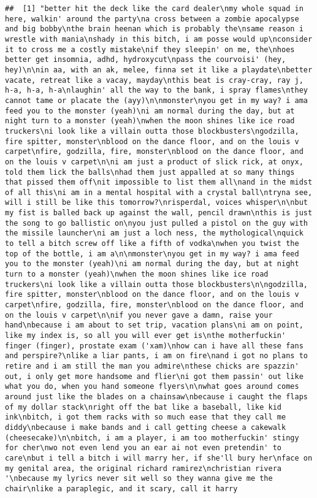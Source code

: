 \documentclass[]{article}
\begin{document}
\begin{verbatim}
##  [1] "better hit the deck like the card dealer\nmy whole squad in here, walkin' around the party\na cross between a zombie apocalypse and big bobby\nthe brain heenan which is probably the\nsame reason i wrestle with mania\nshady in this bitch, i am posse would up\nconsider it to cross me a costly mistake\nif they sleepin' on me, the\nhoes better get insomnia, adhd, hydroxycut\npass the courvoisi' (hey, hey)\n\nin aa, with an ak, melee, finna set it like a playdate\nbetter vacate, retreat like a vacay, mayday\nthis beat is cray-cray, ray j, h-a, h-a, h-a\nlaughin' all the way to the bank, i spray flames\nthey cannot tame or placate the (ayy)\n\nmonster\nyou get in my way? i ama feed you to the monster (yeah)\ni am normal during the day, but at night turn to a monster (yeah)\nwhen the moon shines like ice road truckers\ni look like a villain outta those blockbusters\ngodzilla, fire spitter, monster\nblood on the dance floor, and on the louis v carpet\nfire, godzilla, fire, monster\nblood on the dance floor, and on the louis v carpet\n\ni am just a product of slick rick, at onyx, told them lick the balls\nhad them just appalled at so many things that pissed them off\nit impossible to list them all\nand in the midst of all this\ni am in a mental hospital with a crystal ball\ntryna see, will i still be like this tomorrow?\nrisperdal, voices whisper\n\nbut my fist is balled back up against the wall, pencil drawn\nthis is just the song to go ballistic on\nyou just pulled a pistol on the guy with the missile launcher\ni am just a loch ness, the mythological\nquick to tell a bitch screw off like a fifth of vodka\nwhen you twist the top of the bottle, i am a\n\nmonster\nyou get in my way? i ama feed you to the monster (yeah)\ni am normal during the day, but at night turn to a monster (yeah)\nwhen the moon shines like ice road truckers\ni look like a villain outta those blockbusters\n\ngodzilla, fire spitter, monster\nblood on the dance floor, and on the louis v carpet\nfire, godzilla, fire, monster\nblood on the dance floor, and on the louis v carpet\n\nif you never gave a damn, raise your hand\nbecause i am about to set trip, vacation plans\ni am on point, like my index is, so all you will ever get is\nthe motherfuckin' finger (finger), prostate exam ('xam)\nhow can i have all these fans and perspire?\nlike a liar pants, i am on fire\nand i got no plans to retire and i am still the man you admire\nthese chicks are spazzin' out, i only get more handsome and flier\ni got them passin' out like what you do, when you hand someone flyers\n\nwhat goes around comes around just like the blades on a chainsaw\nbecause i caught the flaps of my dollar stack\nright off the bat like a baseball, like kid ink\nbitch, i got them racks with so much ease that they call me diddy\nbecause i make bands and i call getting cheese a cakewalk (cheesecake)\n\nbitch, i am a player, i am too motherfuckin' stingy for cher\nwo not even lend you an ear ai not even pretendin' to care\nbut i tell a bitch i will marry her, if she'll bury her\nface on my genital area, the original richard ramirez\nchristian rivera '\nbecause my lyrics never sit well so they wanna give me the chair\nlike a paraplegic, and it scary, call it harry 
\end{verbatim}
\end{document}
